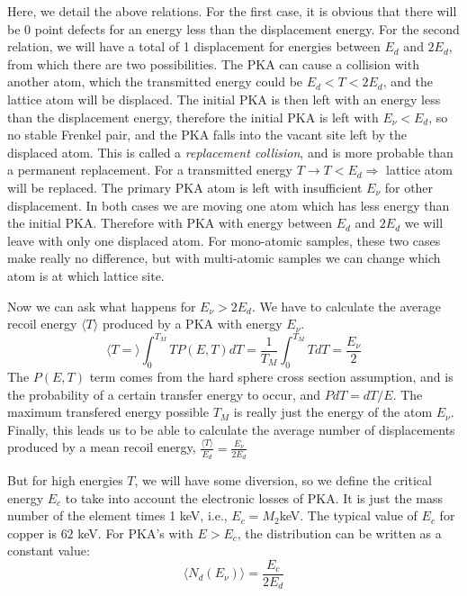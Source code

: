 Here, we detail the above relations.
For the first case, it is obvious that there will be 0 point defects for an energy less than the displacement energy.
For the second relation, we will have a total of 1 displacement for energies between $E_d $ and $2 E_d$, from which there are two possibilities.
The PKA can cause a collision with another atom, which the transmitted energy could be $E_d < T < 2E_d$, and the lattice atom will be displaced.
The initial PKA is then left with an energy less than the displacement energy, therefore the initial PKA is left with $E_\nu < E_d$, so no stable Frenkel pair, and the PKA falls into the vacant site left by the displaced atom.
This is called a \textit{replacement collision}, and is more probable than a permanent replacement.
For a transmitted energy $T \rightarrow T < E_d \Rightarrow$ lattice atom will  be replaced.
The primary PKA atom is left with insufficient  $E_\nu$ for other displacement.
In both cases we are moving one atom which has less energy than the initial PKA.
Therefore with PKA with energy between $E_d$ and $2E_d$ we will leave with only one displaced atom.
For mono-atomic samples, these two cases make really no difference, but with multi-atomic samples we can change which atom is at which lattice site.

Now we can ask what happens for $E_\nu > 2E_d$.
We have to calculate the average recoil energy $\langle T \rangle $ produced by a PKA with energy $E_\nu$.
$$ \langle T =  \rangle \int_0^{T_M} T P(E,T) dT = \frac{1}{T_M} \int_0^{T_M} TdT = \frac{E_\nu}{2} $$
The $P(E,T)$ term comes from the hard sphere cross section assumption, and is the probability of a certain transfer energy to occur, and $PdT = dT / E$.
The maximum transfered energy possible $T_M$ is really just the energy of the atom $E_\nu$.
Finally, this leads us to be able to calculate the average number of displacements produced by a mean recoil energy, $\frac{\langle T \rangle}{E_d} = \frac{E_\nu}{2E_d}$

But for high energies $T$, we will have some diversion, so we define the critical energy $E_c$ to take into account the electronic losses of PKA.
It is just the mass number of the element times 1 keV, i.e., $E_c = M_2$keV. The typical value of $E_c $ for copper is $62$ keV.
For PKA's with $E > E_c$, the distribution can be written as a constant value:
$$\langle N_d (E_\nu) \rangle  = \frac{E_c}{2E_d}$$



